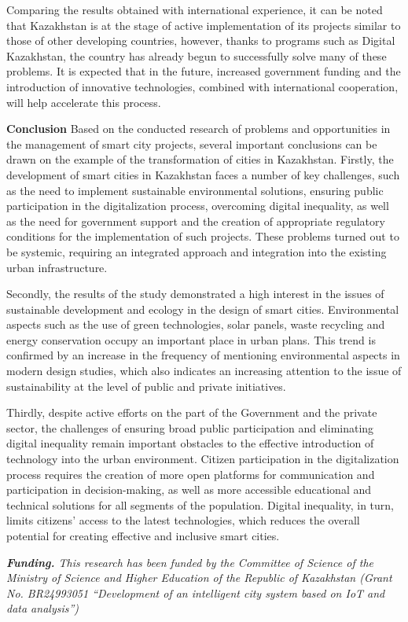 \begin{multicols}{2}
Comparing the results obtained with international experience, it can be
noted that Kazakhstan is at the stage of active implementation of its
projects similar to those of other developing countries, however, thanks
to programs such as Digital Kazakhstan, the country has already begun to
successfully solve many of these problems. It is expected that in the
future, increased government funding and the introduction of innovative
technologies, combined with international cooperation, will help
accelerate this process.

{\bfseries Conclusion} Based on the conducted research of problems and
opportunities in the management of smart city projects, several
important conclusions can be drawn on the example of the transformation
of cities in Kazakhstan. Firstly, the development of smart cities in
Kazakhstan faces a number of key challenges, such as the need to
implement sustainable environmental solutions, ensuring public
participation in the digitalization process, overcoming digital
inequality, as well as the need for government support and the creation
of appropriate regulatory conditions for the implementation of such
projects. These problems turned out to be systemic, requiring an
integrated approach and integration into the existing urban
infrastructure.

Secondly, the results of the study demonstrated a high interest in the
issues of sustainable development and ecology in the design of smart
cities. Environmental aspects such as the use of green technologies,
solar panels, waste recycling and energy conservation occupy an
important place in urban plans. This trend is confirmed by an increase
in the frequency of mentioning environmental aspects in modern design
studies, which also indicates an increasing attention to the issue of
sustainability at the level of public and private initiatives.

Thirdly, despite active efforts on the part of the Government and the
private sector, the challenges of ensuring broad public participation
and eliminating digital inequality remain important obstacles to the
effective introduction of technology into the urban environment. Citizen
participation in the digitalization process requires the creation of
more open platforms for communication and participation in
decision-making, as well as more accessible educational and technical
solutions for all segments of the population. Digital inequality, in
turn, limits citizens'{} access to the latest
technologies, which reduces the overall potential for creating effective
and inclusive smart cities.

\emph{{\bfseries Funding.} This research has been funded by the Committee
of Science of the Ministry of Science and Higher Education of the
Republic of Kazakhstan (Grant No. BR24993051 ``Development of an
intelligent city system based on IoT and data analysis'')}
\end{multicols}

